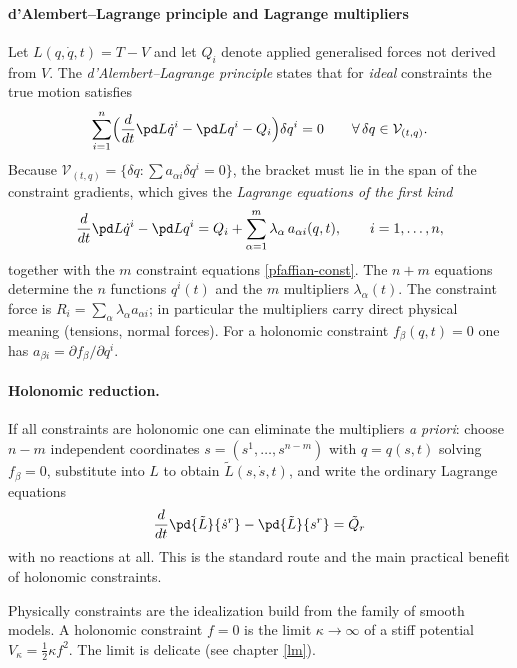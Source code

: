 \paragraph{d'Alembert--Lagrange principle and Lagrange multipliers}
Let $L(q,\dot q,t)=T-V$ and let $Q_i$ denote applied generalised forces not derived from
$V$. The \emph{d'Alembert--Lagrange principle} states that for \emph{ideal} constraints the
true motion satisfies
\begin{equation}\label{dalembert}
  \sum_{i=1}^n\Bigl(\frac{d}{dt}\pd L{\dot q^i}-\pd L{q^i}-Q_i\Bigr)\delta q^i=0
  \qquad\forall\,\delta q\in\mathcal V_{(t,q)}.
\end{equation}
Because $\mathcal V_{(t,q)}=\{\delta q:\sum a_{\alpha i}\delta q^i=0\}$, the bracket must lie in the
span of the constraint gradients, which gives the \emph{Lagrange equations of the first kind}
\begin{equation}
    \label{lagrange-first}
  \frac{d}{dt}\pd L{\dot q^i}-\pd L{q^i}=Q_i+\sum_{\alpha=1}^m\lambda_\alpha\,a_{\alpha i}(q,t),
  \qquad i=1,\dots,n,
\end{equation}
together with the $m$ constraint equations \eqref{pfaffian-const}. The $n+m$ equations determine
the $n$ functions $q^i(t)$ and the $m$ multipliers $\lambda_\alpha(t)$. The constraint force
is $R_i=\sum_\alpha\lambda_\alpha a_{\alpha i}$; in particular the multipliers carry
direct physical meaning (tensions, normal forces). For a holonomic constraint $f_\beta(q,t)=0$
one has $a_{\beta i}=\partial f_\beta/\partial q^i$.

\paragraph{Holonomic reduction.} If all constraints are holonomic one can eliminate
the multipliers \emph{a priori}: choose $n-m$ independent coordinates $s=(s^1,\dots,s^{n-m})$
with $q=q(s,t)$ solving $f_\beta=0$, substitute into $L$ to obtain $\tilde L(s,\dot s,t)$, and
write the ordinary Lagrange equations
\begin{equation*}
   \label {}
    \frac{d}{dt}\pd{\tilde L}{\dot s^r}-\pd{\tilde L}{s^r}=\tilde Q_r
\end{equation*}
 with no reactions at all.
This is the standard route and the main practical benefit of holonomic constraints.

Physically constraints are  the idealization build from the 
family of smooth models. A holonomic constraint $f=0$ is the limit
$\kappa\to\infty$ of a stiff potential $V_\kappa=\tfrac12\kappa f^2$. The limit
is delicate (see chapter \ref{lm}).

